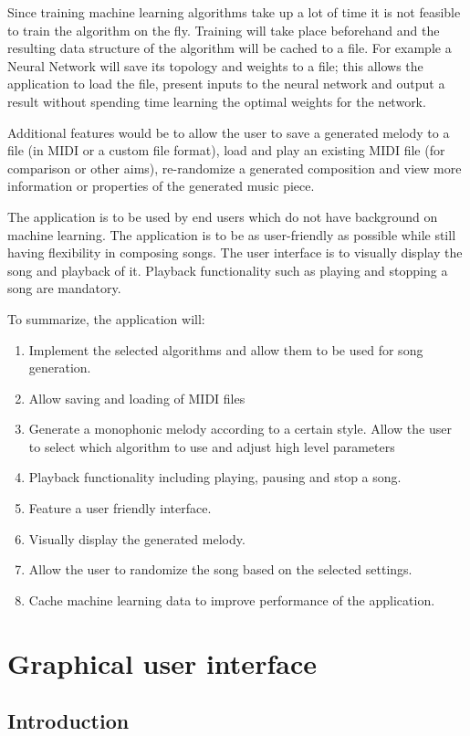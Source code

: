 Since training machine learning algorithms take up a lot of time it is not feasible to train the algorithm on the fly. Training will take place beforehand and the resulting data structure of the algorithm will be cached to a file. 
For example a Neural Network will save its topology and weights to a file; this allows the application to load the file, present inputs to the neural network and output a result without spending time learning the optimal weights for the network.

Additional features would be to allow the user to save a generated melody to a file (in \ac{MIDI} or a custom file format), load and play an existing \ac{MIDI} file (for comparison or other aims), re-randomize a generated composition and view more information or properties of the generated music piece.

The application is to be used by end users which do not have background on machine learning. The application is to be as user-friendly as possible while still having flexibility in composing songs. The user interface is to visually display the song and playback of it. Playback functionality such as playing and stopping a song are mandatory.

To summarize, the application will:
\begin{enumerate}
\item Implement the selected algorithms and allow them to be used for song generation.
\item Allow saving and loading of \ac{MIDI} files
\item Generate a monophonic melody according to a certain style. Allow the user to select which algorithm to use and adjust high level parameters
\item Playback functionality including playing, pausing and stop a song. 
\item Feature a user friendly interface.
\item Visually display the generated melody.
\item Allow the user to randomize the song based on the selected settings.
\item Cache machine learning data to improve performance of the application.
\end{enumerate}

\chapter{Graphical user interface}

\section{Introduction}

